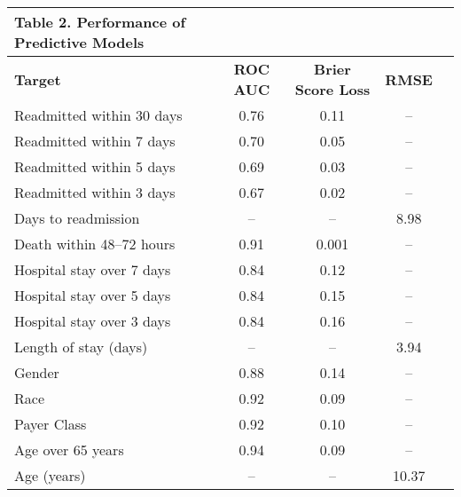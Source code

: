 \begin{adjustbox}{width={\textwidth},keepaspectratio,frame}%
{
\begin{tabular}{lcccc}
\rowcolor{NEJMTopRow} \multicolumn{4}{l}%
{{\textbf{\color{NEJMRed} Table 2.}}
\textbf{Performance of Predictive Models}} 
\\ %
\hline
\textbf{Target} & \textbf{ROC AUC} & \textbf{Brier Score Loss} &   \textbf{RMSE} \\
Readmitted within 30 days &    0.76 &              0.11 &        -- \\
Readmitted within 7 days  &    0.70 &              0.05 &        -- \\
Readmitted within 5 days  &    0.69 &              0.03 &        -- \\
Readmitted within 3 days  &    0.67 &              0.02 &        -- \\
Days to readmission       &      -- &                -- &      8.98 \\
Death within 48--72 hours &    0.91 &              0.001 &        -- \\
Hospital stay over 7 days &    0.84 &              0.12 &        -- \\
Hospital stay over 5 days &    0.84 &              0.15 &        -- \\
Hospital stay over 3 days &    0.84 &              0.16 &        -- \\
Length of stay (days)     &      -- &                -- &      3.94 \\
Gender                    &    0.88 &              0.14 &        -- \\
Race                      &    0.92 &              0.09 &        -- \\
Payer Class               &    0.92 &              0.10 &        -- \\
Age over 65 years         &    0.94 &              0.09 &        -- \\
Age (years)               &      -- &                -- &     10.37 \\
\end{tabular}
\label{table:table2}
}
\end{adjustbox}



